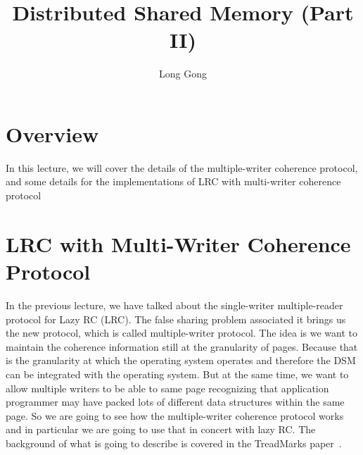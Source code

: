 \documentclass[11pt]{lecture}
\begin{document}
\title{Distributed Shared Memory (Part II)}%
\author{Long Gong}
\maketitle

\section{Overview}\label{sec: overview}

In this lecture, we will cover the details of the multiple-writer coherence protocol, and some details 
for the implementations of LRC with multi-writer coherence protocol


\section{LRC with Multi-Writer Coherence Protocol}\label{sec: lrc-mwcp}

In the previous lecture, we have talked about the single-writer multiple-reader protocol for Lazy RC (LRC). 
The false sharing problem associated it brings us the new protocol, which is called multiple-writer 
protocol. The idea is we want to maintain the coherence information still at the granularity
of pages. Because that is the granularity at which the operating system operates and therefore the DSM 
can be integrated with the operating system. But at the same time, we want to allow multiple writers to be able to 
same page recognizing that application programmer may have packed lots of different data structures 
within the same page. So we are going to see how the multiple-writer coherence protocol 
works and in particular we are going to use that in concert with lazy RC. The background of what is going to describe 
is covered in the TreadMarks paper~\cite{Amza1996DSM}. 
\end{document}
